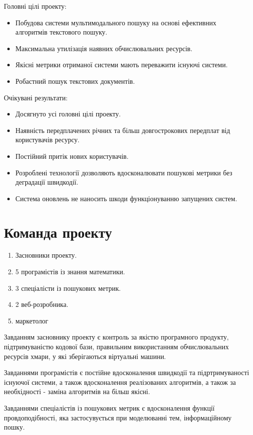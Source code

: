 Головні цілі проекту:
\begin{itemize}
  \item Побудова системи мультимодального пошуку на основі ефективних алгоритмів текстового пошуку.
  \item Максимальна утилізація наявних обчислювальних ресурсів.
  \item Якісні метрики отриманої системи мають переважити існуючі системи.
  \item Робастний пошук текстових документів.
\end{itemize}

Очікувані результати:
\begin{itemize}
  \item Досягнуто усі головні цілі проекту.
  \item Наявність передплачених річних та більш довгострокових передплат від користувачів ресурсу.
  \item Постійний притік нових користувачів.
  \item Розроблені технології дозволяють вдосконалювати пошукові метрики без деградації швидкодії.
  \item Система оновлень не наносить шкоди функціонуванню запущених систем.
\end{itemize}

\section{Команда проекту}
\begin{enumerate}
  \item Засновники проекту.
  \item 5 програмістів із знання математики.
  \item 3 спеціалісти із пошукових метрик.
  \item 2 веб-розробника.
  \item маркетолог
\end{enumerate}
Завданням засновнику проекту є контроль за якістю програмного продукту, підтримуваністю кодової бази, правильним використанням обчислювальних ресурсів хмари, у які зберігаються віртуальні машини.

Завданнями програмістів є постійне вдосконалення швидкодії та підртримуваності існуючої системи, а також вдосконалення реалізованих алгоритмів, а також за необхідності - заміна алгоритмів на
більш якісні.

Завданнями спеціалістів із пошукових метрик є вдосконалення функції провдоподібності, яка застосувується при моделюванні тем, інформаційному пошку.


